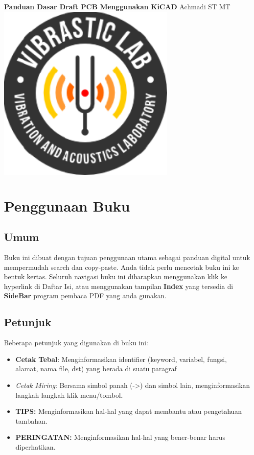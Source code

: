 \documentclass[12pt]{book}
\date{}
\begin{document}
	
	\frontmatter
	\begin{titlepage}
		\centering
		{\LARGE \bf Panduan Dasar Draft PCB Menggunakan KiCAD}
		\vfill
		{\Large Achmadi ST MT}
		\vfill
		\includegraphics[width=250pt]{images/logo/logoviblab}
		\vfill
		\vfill
	\end{titlepage}
	
	
	\newpage
	\tableofcontents
	
	

	\newpage
	\chapter{Penggunaan Buku}
	
	\section{Umum}
	Buku ini dibuat dengan tujuan penggunaan utama sebagai panduan digital untuk mempermudah search dan copy-paste.
	Anda tidak perlu mencetak buku ini ke bentuk kertas.
	Seluruh navigasi buku ini diharapkan menggunakan klik ke hyperlink di Daftar Isi,
	atau menggunakan tampilan \textbf{Index} yang tersedia di \textbf{SideBar} program pembaca PDF yang anda gunakan.
	
	\section{Petunjuk}
	Beberapa petunjuk yang digunakan di buku ini:
	\begin{itemize}
		\item \textbf{Cetak Tebal}: Menginformasikan identifier (keyword, variabel, fungsi, alamat, nama file, dst) yang berada di suatu paragraf
		\item \textit{Cetak Miring}: Bersama simbol panah (->) dan simbol lain, menginformasikan langkah-langkah klik menu/tombol.
		\item \textbf{TIPS:} Menginformasikan hal-hal yang dapat membantu atau pengetahuan tambahan.
		\item \textbf{PERINGATAN:} Menginformasikan hal-hal yang bener-benar harus diperhatikan.
	\end{itemize}
\end{document}
